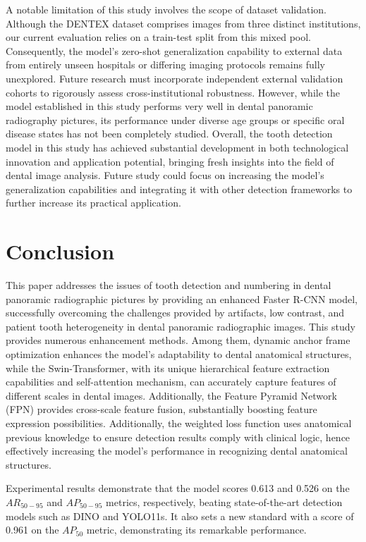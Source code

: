 \documentclass[pdflatex,sn-mathphys-num]{sn-jnl}%
\theoremstyle{thmstyleone}%
\theoremstyle{thmstyletwo}%
\theoremstyle{thmstylethree}%
\begin{document}
A notable limitation of this study involves the scope of dataset validation. Although the DENTEX dataset comprises images from three distinct institutions, our current evaluation relies on a train-test split from this mixed pool. Consequently, the model's zero-shot generalization capability to external data from entirely unseen hospitals or differing imaging protocols remains fully unexplored. Future research must incorporate independent external validation cohorts to rigorously assess cross-institutional robustness. However, while the model established in this study performs very well in dental panoramic radiography pictures, its performance under diverse age groups or specific oral disease states has not been completely studied.  Overall, the tooth detection model in this study has achieved substantial development in both technological innovation and application potential, bringing fresh insights into the field of dental image analysis.  Future study could focus on increasing the model's generalization capabilities and integrating it with other detection frameworks to further increase its practical application.

\section{Conclusion}

This paper addresses the issues of tooth detection and numbering in dental panoramic radiographic pictures by providing an enhanced Faster R-CNN model, successfully overcoming the challenges provided by artifacts, low contrast, and patient tooth heterogeneity in dental panoramic radiographic images.  This study provides numerous enhancement methods.  Among them, dynamic anchor frame optimization enhances the model's adaptability to dental anatomical structures, while the Swin-Transformer, with its unique hierarchical feature extraction capabilities and self-attention mechanism, can accurately capture features of different scales in dental images.  Additionally, the Feature Pyramid Network (FPN) provides cross-scale feature fusion, substantially boosting feature expression possibilities.  Additionally, the weighted loss function uses anatomical previous knowledge to ensure detection results comply with clinical logic, hence effectively increasing the model's performance in recognizing dental anatomical structures.

Experimental results demonstrate that the model scores 0.613 and 0.526 on the $AR_{50-95}$ and $AP_{50-95}$ metrics, respectively, beating state-of-the-art detection models such as DINO and YOLO11s.  It also sets a new standard with a score of 0.961 on the $AP_{50}$ metric, demonstrating its remarkable performance.
\end{document}
